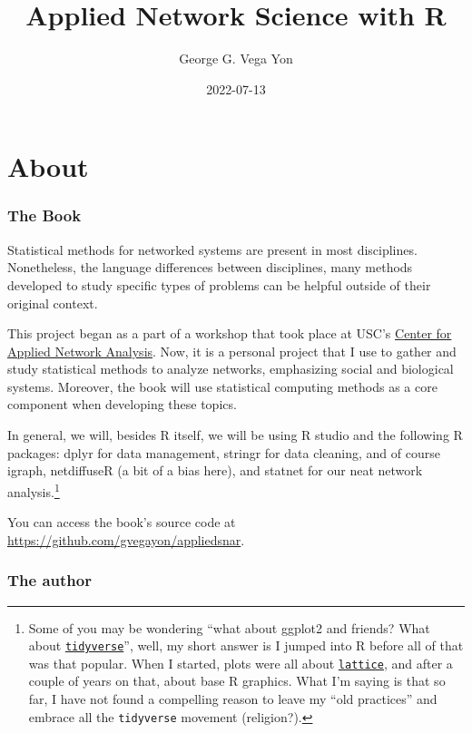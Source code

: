 \documentclass[]{book}
\title{Applied Network Science with R}
\author{George G. Vega Yon}
\date{2022-07-13}
\begin{document}
\maketitle

{
\setcounter{tocdepth}{1}
\tableofcontents
}
\hypertarget{about}{%
\chapter{About}\label{about}}

\renewcommand{\Pr}[1]{\mbox{Pr}\left(#1\right)}
\renewcommand{\exp}[1]{\mbox{exp}\left\{#1\right\}}

\hypertarget{the-book}{%
\subsection{The Book}\label{the-book}}

Statistical methods for networked systems are present in most disciplines.
Nonetheless, the language differences between disciplines, many methods
developed to study specific types of problems can be helpful outside of their original context.

This project began as a part of a workshop that took place at USC's
\href{https://cana.usc.edu}{Center for Applied Network Analysis}. Now, it is a personal
project that I use to gather and study statistical methods to analyze networks, emphasizing social and biological systems.
Moreover, the book will use statistical computing methods as a core component
when developing these topics.

In general, we will, besides R itself, we will be using R studio and the following
R packages: dplyr for data management, stringr for data cleaning, and of course
igraph, netdiffuseR (a bit of a bias here), and statnet for our neat network
analysis.\footnote{Some of you may be wondering ``what about ggplot2 and friends? What about \href{https://www.tidyverse.org/}{\texttt{tidyverse}}'', well, my short answer is I jumped into R before all of that was that popular. When I started, plots were all about \href{https://CRAN.R-project.org/package=lattice}{\texttt{lattice}}, and after a couple of years on that, about base R graphics. What I'm saying is that so far, I have not found a compelling reason to leave my ``old practices'' and embrace all the \texttt{tidyverse} movement (religion?).}

You can access the book's source code at \url{https://github.com/gvegayon/appliedsnar}.

\hypertarget{the-author}{%
\subsection{The author}\label{the-author}}
\end{document}
